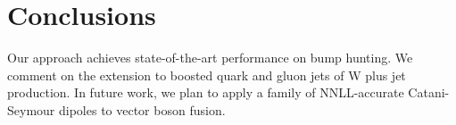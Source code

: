 \section{Conclusions}\label{sec:conclusions}

Our approach achieves state-of-the-art performance on bump hunting. We
comment on the extension to boosted quark and gluon jets of W plus jet
production. In future work, we plan to apply a family of NNLL-accurate
Catani-Seymour dipoles to vector boson fusion.

